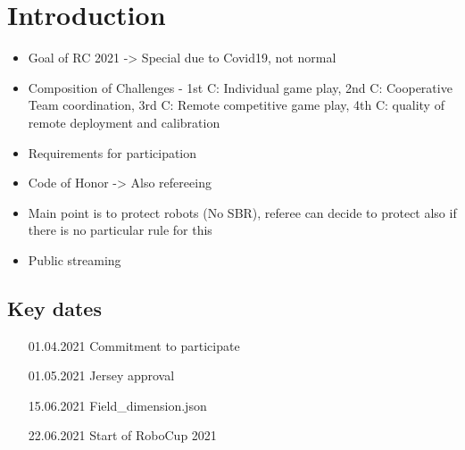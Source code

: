 \section{Introduction}

\begin{itemize}
    \item Goal of RC 2021 -> Special due to Covid19, not normal
    \item Composition of Challenges - 1st C: Individual game play, 2nd C: Cooperative Team coordination, 3rd C: Remote competitive game play, 4th C: quality of remote deployment and calibration 
    \item Requirements for participation
    \item Code of Honor -> Also refereeing
    \item Main point is to protect robots (No SBR), referee can decide to protect also if there is no particular rule for this
    \item Public streaming
\end{itemize}

\subsection{Key dates}

\begin{itemize}
    \item [01.04.2021] Commitment to participate
    \item [01.05.2021] Jersey approval
    \item [15.06.2021] Field_dimension.json
    \item [22.06.2021] Start of RoboCup 2021
\end{itemize}